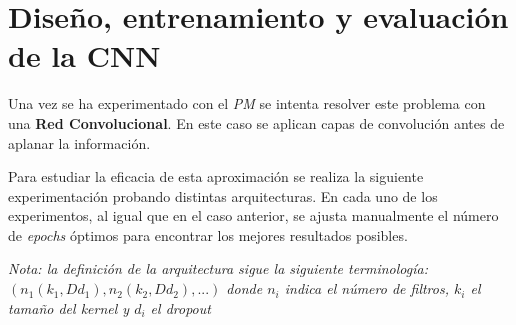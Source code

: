\documentclass{uc3mpracticas}
\begin{document}
\section{Diseño, entrenamiento y evaluación de la CNN}

Una vez se ha experimentado con el \textit{PM} se intenta resolver este problema con una \textbf{Red Convolucional}. En este caso se aplican capas de convolución antes de aplanar la información.

\vspace{2mm}

Para estudiar la eficacia de esta aproximación se realiza la siguiente experimentación probando distintas arquitecturas. En cada uno de los experimentos, al igual que en el caso anterior, se ajusta manualmente el número de \textit{epochs} óptimos para encontrar los mejores resultados posibles.


\vspace{1mm}

\textit{Nota: la definición de la arquitectura sigue la siguiente terminología: $(n_1(k_1, Dd_1), n_2(k_2, Dd_2), ...)$ donde $n_i$ indica el número de filtros, $k_i$ el tamaño del kernel y $d_i$ el dropout}
\end{document}
